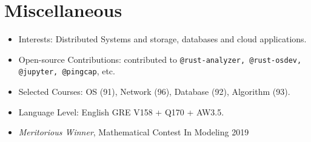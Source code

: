 \documentclass{resume}
\newcommand{\en}[1]{#1}
\newcommand{\zh}[1]{}
\begin{document}
\section{\en{Miscellaneous}\zh{其他}}
\begin{itemize}[parsep=0.25ex]
      \item \en{Interests: Distributed Systems and storage, databases and cloud applications.}
            \zh{兴趣：分布式系统、存储、数据库、云计算应用等}
      \item \en{Open-source Contributions: contributed to \texttt{@rust-analyzer, @rust-osdev, @jupyter, @pingcap}, etc.}
            \zh{开源贡献: 为 \texttt{@rust-analyzer, @rust-osdev, @jupyter, @pingcap} 等组织贡献过代码}
      \item \en{Selected Courses: OS (91), Network (96), Database (92), Algorithm (93).}
            \zh{主修课程：操作系统（91）、计算机网络（96）、数据库系统原理（92）、算法设计与分析（93）}
      \item \en{Language Level: English GRE V158 + Q170 + AW3.5.}
            \zh{语言水平：英语 GRE V158 + Q170 + AW3.5}
      \item \textit{Meritorious Winner}, Mathematical Contest In Modeling 2019
\end{itemize}
\end{document}
